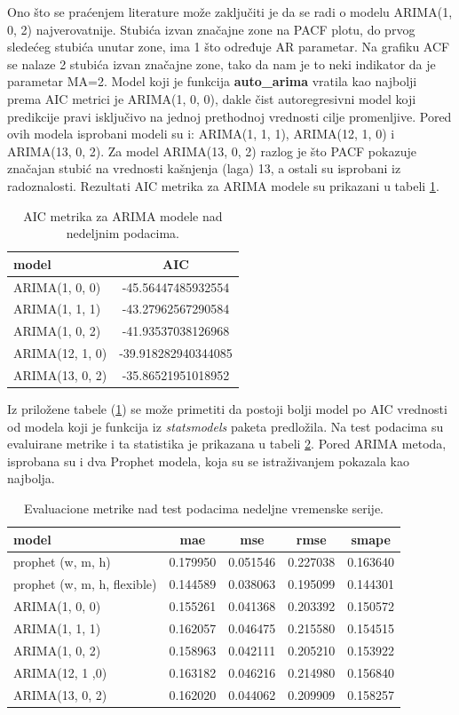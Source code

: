 \documentclass[12pt,oneside]{memoir}
\begin{document}
Ono što se praćenjem literature može zaključiti je da se radi o modelu ARIMA(1, 0, 2) najverovatnije. Stubića izvan značajne zone na PACF plotu, do prvog sledećeg stubića unutar zone, ima 1 što određuje AR parametar. Na grafiku ACF se nalaze 2 stubića izvan značajne zone, tako da nam je to neki indikator da je parametar MA=2. Model koji je funkcija \textbf{auto\_arima} vratila kao najbolji prema AIC metrici je ARIMA(1, 0, 0), dakle čist autoregresivni model koji predikcije pravi isključivo na jednoj prethodnoj vrednosti cilje promenljive. Pored ovih modela isprobani modeli su i: ARIMA(1, 1, 1), ARIMA(12, 1, 0) i ARIMA(13, 0, 2). Za model ARIMA(13, 0, 2) razlog je što PACF pokazuje značajan stubić na vrednosti kašnjenja (laga) 13, a ostali su isprobani iz radoznalosti. Rezultati AIC metrika za ARIMA modele su prikazani u tabeli \ref{tbl: arima_aic_nedeljna}.
\begin{table}
\centering
\caption{AIC metrika za ARIMA modele nad nedeljnim podacima.}
\label{tbl: arima_aic_nedeljna}
\begin{tabular}{ |l|c|} 
\hline
model & AIC \\
\hline
ARIMA(1, 0, 0) & -45.56447485932554\\
ARIMA(1, 1, 1) & -43.27962567290584\\
ARIMA(1, 0, 2) & -41.93537038126968\\
ARIMA(12, 1, 0) & -39.918282940344085\\
ARIMA(13, 0, 2) & -35.86521951018952\\
\hline
\end{tabular}
\end{table}
Iz priložene tabele (\ref{tbl: arima_aic_nedeljna}) se može primetiti da postoji bolji model po AIC vrednosti od modela koji je funkcija iz \textit{statsmodels} paketa predložila. Na test podacima su evaluirane metrike i ta statistika je prikazana u tabeli \ref{tbl: nedeljna_serija_metrike}. Pored ARIMA metoda, isprobana su i dva Prophet modela, koja su se istraživanjem pokazala kao najbolja. 
\begin{table}
\centering
\caption{Evaluacione metrike nad test podacima nedeljne vremenske serije.}
\label{tbl: nedeljna_serija_metrike}
\begin{tabular}{ |l|c|c|c|c|} 
\hline
model & mae & mse & rmse & smape\\
\hline
prophet (w, m, h) & 0.179950 & 0.051546 & 0.227038 & 0.163640\\
prophet (w, m, h, flexible) & 0.144589 & 0.038063 & 0.195099 & 0.144301\\
ARIMA(1, 0, 0) & 0.155261 & 0.041368 & 0.203392 & 0.150572\\
ARIMA(1, 1, 1) & 0.162057 & 0.046475 & 0.215580 & 0.154515\\
ARIMA(1, 0, 2) & 0.158963 & 0.042111 & 0.205210 & 0.153922\\
ARIMA(12, 1 ,0) & 0.163182 & 0.046216 & 0.214980 & 0.156840\\
ARIMA(13, 0, 2) & 0.162020 & 0.044062 & 0.209909 & 0.158257\\
\hline
\end{tabular}
\end{table}
\end{document}
